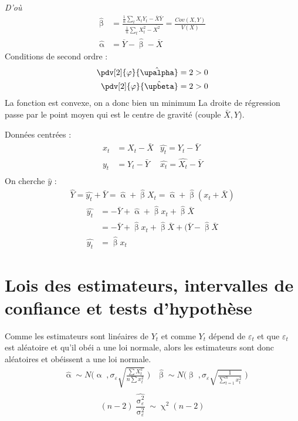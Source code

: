 \documentclass{article}
\newcommand{\hbeta}{\hat{\upbeta}}
\newcommand{\halpha}{\hat{\upalpha}}
\newcommand{\et}{\varepsilon_t}
\newcommand{\sumt}{\sum\limits_{t=1}^n}
\newcommand{\sig}{\upsigma_\varepsilon^2}
\begin{document}
\textit{D'où}
{
\color{red}
\begin{align*}
	\hat{\upbeta} &= \frac{\frac{1}{n}\sum_t X_tY_t - \overline{X} \overline{Y}}{\frac{1}{n}\sum_t X_t^2 - \overline{X^2}} = \frac{Cov(X,Y)}{V(X)} \\
	\hat{\upalpha} &= \overline{Y} - \hat{\upbeta} - \overline{X}
\end{align*}
}
Conditions de second ordre : 
\begin{align*}
	\pdv[2]{\varphi}{\hat{\upalpha}} &= 2 >0 \\
	\pdv[2]{\varphi}{\hat{\upbeta}} &= 2 >0
\end{align*}
La fonction est convexe, on a donc bien un minimum 
\newpage
La droite de régression passe par le point moyen qui est le centre de gravité (couple \(\bar{X},Y\)).

Données centrées : 
\begin{align*}
	x_t &= X_t - \bar{X} &\hat{y_t} = \hat{Y_t} - \bar{Y}\\
	y_t &= Y_t - \bar{Y} &\hat{x_t} = \hat{X_t} - \bar{Y}\\
\end{align*}
On cherche \(\hat{y} \) :
\begin{align*}
	\hat{Y} = \hat{y_t} + \bar{Y} = \hat{\upalpha} + \hat{\upbeta} X_t  = \hat{\upalpha} + \hat{\upbeta} (x_t + \bar{X})	
\end{align*} 
\begin{align*}
	\hat{y_t} &= - \bar{Y} + \halpha + \hbeta x_t + \hbeta \bar{X} \\
	&= - \bar{Y} + \hbeta x_t + \hbeta \bar{X} + (\bar{Y} - \hbeta \bar{X} \\
	\hat{y_t} &= \hbeta x_t
\end{align*}

\section{Lois des estimateurs, intervalles de confiance et tests d'hypothèse}
Comme les estimateurs sont linéaires de \(Y_t\) et comme \(Y_t\) dépend de \(\et\) et que \(\et\) est aléatoire et qu'il obéi a une loi normale, alors les estimateurs sont donc aléatoires et obéissent a une loi normale.
\begin{align*}
	& \halpha \sim N \Bigg(\upalpha \; , \sigma_\varepsilon \sqrt{\frac{\sum X^2_t}{n \sum x_t^2 }} \; \Bigg) &\hbeta \sim N \Bigg( \upbeta \; , \sigma_\varepsilon \sqrt{\frac{1}{\sumt x_t^2}} \; \Bigg) \\
\end{align*}
\[(n-2) \frac{\hat{\sig}}{\sig} \sim \upchi^2 (n-2)\]
\end{document}
